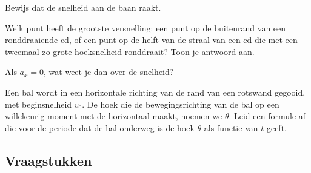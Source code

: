 \begin{exercise} Bewijs dat de snelheid aan de baan raakt.







\end{exercise}

\begin{exercise} Welk punt heeft de grootste versnelling: een punt op de buitenrand van een ronddraaiende cd, of een punt op de helft van de straal van een cd die met een tweemaal zo grote hoeksnelheid ronddraait? Toon je antwoord aan.

\end{exercise}

\begin{exercise} Als $a_x=0$, wat weet je dan over de snelheid?

\end{exercise}

\begin{exercise} Een bal wordt in een horizontale richting van de rand van een rotswand gegooid, met beginsnelheid $v_0$. De hoek die de bewegingsrichting van de bal op een willekeurig moment met de horizontaal maakt, noemen we $\theta$. Leid een formule af die voor de periode dat de bal onderweg is de hoek $\theta$ als functie van $t$ geeft.

\end{exercise}

\subsection{Vraagstukken}

	





